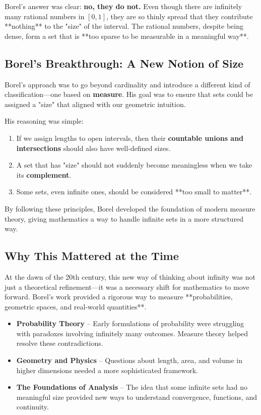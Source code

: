 Borel’s answer was clear: \textbf{no, they do not.} Even though there are infinitely many rational numbers in \( [0,1] \), they are so thinly spread that they contribute **nothing** to the "size" of the interval. The rational numbers, despite being dense, form a set that is **too sparse to be measurable in a meaningful way**.

\subsection{Borel’s Breakthrough: A New Notion of Size}

Borel’s approach was to go beyond cardinality and introduce a different kind of classification—one based on \textbf{measure}. His goal was to ensure that sets could be assigned a "size" that aligned with our geometric intuition.

His reasoning was simple:
\begin{enumerate}
    \item If we assign lengths to open intervals, then their \textbf{countable unions and intersections} should also have well-defined sizes.
    \item A set that has "size" should not suddenly become meaningless when we take its \textbf{complement}.
    \item Some sets, even infinite ones, should be considered **too small to matter**.
\end{enumerate}

By following these principles, Borel developed the foundation of modern measure theory, giving mathematics a way to handle infinite sets in a more structured way.

\subsection{Why This Mattered at the Time}

At the dawn of the 20th century, this new way of thinking about infinity was not just a theoretical refinement—it was a necessary shift for mathematics to move forward. Borel’s work provided a rigorous way to measure **probabilities, geometric spaces, and real-world quantities**.

\begin{itemize}
    \item \textbf{Probability Theory} – Early formulations of probability were struggling with paradoxes involving infinitely many outcomes. Measure theory helped resolve these contradictions.
    \item \textbf{Geometry and Physics} – Questions about length, area, and volume in higher dimensions needed a more sophisticated framework.
    \item \textbf{The Foundations of Analysis} – The idea that some infinite sets had no meaningful size provided new ways to understand convergence, functions, and continuity.
\end{itemize}

